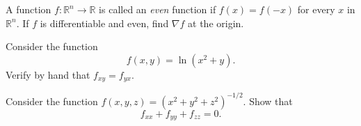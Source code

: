 \documentclass[openany]{book}
\newcommand{\R}{\mathbb{R}}
\begin{document}
\newpage
\begin{prob}
    A function $f\colon\R^n\to\R$ is called an \textit{even} function if $f(x)=f(-x)$ for every $x$ in $\R^n$. If $f$ is differentiable and even, find $\nabla f$ at the origin.
\end{prob}
\newpage


\newpage
\begin{prob}
    Consider the function
    \[f(x,y)={\ln(x^2+y)}.\]
    Verify by hand that $f_{xy}=f_{yx}$.
\end{prob}

\begin{prob}
    Consider the function $f(x,y,z)=\left(x^2+y^2+z^2\right)^{-1/2}$. Show that
    \[f_{xx}+f_{yy}+f_{zz}=0.\]
\end{prob}
\end{document}
